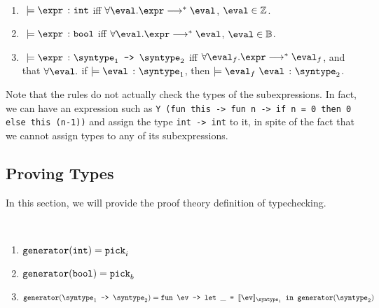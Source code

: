 \begin{definition}
  \label{def_typingM}
  \ \par
  \begin{enumerate}
      \item $\ \models \hastype{\expr}{\tint}$ iff $\forall \eval. \expr \smallsteps[] \eval$, $\eval \in \mathbb{Z}$.
      \item $\ \models \hastype{\expr}{\tbool}$ iff $\forall \eval.\expr \smallsteps[] \eval$, $\eval \in \mathbb{B}$.
      \item $\ \models \hastype{\expr}{\mkfun{\syntype_1}{\syntype_2}}$ iff $\forall \eval_f.\expr \smallsteps[] \eval_f$, and that $\forall{\eval}.$ if $\models \hastype{\eval}{\syntype_1}$, then $\models \hastype{\eval_f\ \eval}{\syntype_2}$.
   \end{enumerate}
\end{definition}

Note that the rules do not actually check the types of the subexpressions. In 
fact, we can have an expression such as \texttt{Y}\ 
\texttt{(fun this -> fun n -> if n = 0 then 0 else this (n-1))} and 
assign the type \texttt{int -> int} to it, in spite of the fact that
we cannot assign types to any of its subexpressions.

\subsection{Proving Types}

In this section, we will provide the proof theory definition of typechecking.

\begin{definition}
  \label{def_genCore}
  \ \par 
  \begin{enumerate}
    \item $\texttt{generator}(\texttt{int}) = \texttt{pick}_i$
    \item $\texttt{generator}(\texttt{bool}) = \texttt{pick}_b$
    \item $\mkgen{\mkfun{\syntype_1}{\syntype_2}} = \mkfunv{\ev}{\letin{\_}{\llbracket \ev \rrbracket_{\syntype_1}}{\mkgen{\syntype_2}}}$
  \end{enumerate}
\end{definition}

